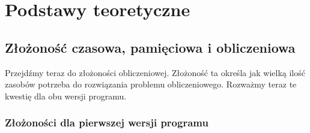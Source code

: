 \documentclass[a4paper,12pt]{article}
\begin{document}
\newpage

\section{Podstawy teoretyczne}
\subsection{Złożoność czasowa, pamięciowa i obliczeniowa}
Przejdźmy teraz do złożoności obliczeniowej. Złożoność ta określa jak wielką ilość zasobów potrzeba do rozwiązania problemu obliczeniowego. Rozważmy teraz te kwestię dla obu wersji programu.

\subsubsection{Złożoności dla pierwszej wersji programu}
\end{document}
